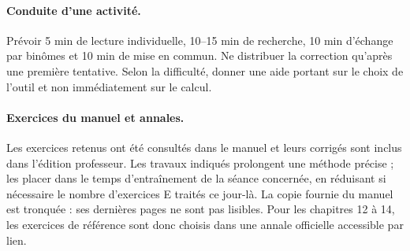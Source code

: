 \paragraph{Conduite d'une activité.} Prévoir 5 min de lecture individuelle, 10--15 min de recherche, 10 min d'échange par binômes et 10 min de mise en commun. Ne distribuer la correction qu'après une première tentative. Selon la difficulté, donner une aide portant sur le choix de l'outil et non immédiatement sur le calcul.
\paragraph{Exercices du manuel et annales.} Les exercices retenus ont été consultés dans le manuel et leurs corrigés sont inclus dans l'édition professeur. Les travaux indiqués prolongent une méthode précise ; les placer dans le temps d'entraînement de la séance concernée, en réduisant si nécessaire le nombre d'exercices E traités ce jour-là. La copie fournie du manuel est tronquée : ses dernières pages ne sont pas lisibles. Pour les chapitres 12 à 14, les exercices de référence sont donc choisis dans une annale officielle accessible par lien.
